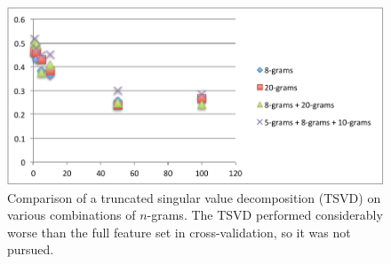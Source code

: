\documentclass[11pt]{amsart}
\begin{document}
\begin{figure}
  \includegraphics{tsvd.pdf}
  \caption{Comparison of a truncated singular value decomposition (TSVD) on various combinations of $n$-grams. The TSVD performed considerably worse than the full feature set in cross-validation, so it was not pursued.}
\end{figure}
\end{document}
